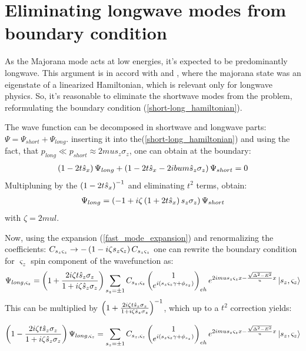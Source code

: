 \section{Eliminating longwave modes from boundary condition}
As the Majorana mode acts at low energies, it's expected to be predominantly longwave. This argument is in accord with \cite{Oreg_2010} and \cite{Lutchyn_2010}, where the majorana state was an eigenstate of a linearized Hamiltonian, which is relevant only for longwave physics. So, it's reasonable to eliminate the shortwave modes from the problem, reformulating the boundary condition (\ref{short-long_hamiltonian}).

The wave function can be decomposed in shortwave and  longwave  parts: $ \Psi = \Psi_{short}+\Psi_{long} $. inserting it into the(\ref{short-long_hamiltonian}) and using the fact, that $ p_{long}\ll p_{short} \approx 2mu s_z \sigma_z $, one can obtain at the boundary:
\begin{gather}
	\left(1-2t\hat{s}_x\right)\Psi_{long}+\left(1-2t\hat{s}_x-2ibum\hat{s}_z \sigma_z\right)\Psi_{short}=0
\end{gather}
Multipluning by the $ \left(1-2t\hat{s}_x\right)^{-1} $ and eliminating $ {t^2} $ terms, obtain:
\begin{gather}
	\Psi_{long}
	=
	\left(-1+i\zeta\left(1+2t\hat{s}_x\right)s_z \sigma_z\right)\Psi_{short}
\end{gather}
with $ \zeta=2mul $.

Now, using the expansion (\ref{fast_mode_expansion}) and renormalizing the coefficients: $ C_{s_z \varsigma_z}\to-\left(1-i\zeta s_z \varsigma_z\right)C_{s_z \varsigma_z} $ one can rewrite the boundary condition for $ \varsigma_z $ spin component of the wavefunction as:
\begin{gather}
\Psi_{long,\varsigma_z}
=
\left(1+\frac{2i\zeta t\hat{s}_z\sigma_z}{1+i\zeta \hat{s}_z\sigma_z}\right)
\sum_{s_z=\pm1}
C_{s_z,\varsigma_z}
		\begin{pmatrix}
	1
	\\
	e^{i\left(s_z\varsigma_z\gamma+\phi_{s_z}\right)}
	\end{pmatrix}_{eh}
	e^{2imus_z\varsigma_zx -\frac{\sqrt{\Delta^2-E^2}}{u}x}
	\ket{s_z, \varsigma_z}
\end{gather}
This can be  multiplied by $ \left(1+\frac{2i\zeta t\hat{s}_z\sigma_z}{1+i\zeta \hat{s}_z\sigma_z}\right)^{-1} $, which up to a $ t^2 $ correction yields:

\begin{gather}
\label{bc_projection}
	\left(1-\frac{2i\zeta t\hat{s}_z\sigma_z}{1+i\zeta \hat{s}_z\sigma_z}\right)
	\Psi_{long,\varsigma_z}
	=
	\sum_{s_z=\pm1}
	C_{s_z,\varsigma_z}
			\begin{pmatrix}
	1
	\\
	e^{i\left(s_z\varsigma_z\gamma+\phi_{s_z}\right)}
	\end{pmatrix}_{eh}
	e^{2imus_z\varsigma_zx -\frac{\sqrt{\Delta^2-E^2}}{u}x}
	\ket{s_z, \varsigma_z}
\end{gather}

